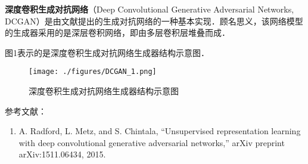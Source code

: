 
\textbf{深度卷积生成对抗网络}（Deep Convolutional Generative Adversarial Networks, DCGAN）是由文献\cite{DCGAN}提出的生成对抗网络的一种基本实现．顾名思义，该网络模型的生成器采用的是深层卷积网络，即由多层卷积层堆叠而成．

图1表示的是深度卷积生成对抗网络生成器结构示意图．
\begin{figure}[ht]
\centering
\texttt{[image: ./figures/DCGAN\_1.png]}
\caption{深度卷积生成对抗网络生成器结构示意图} \label{DCGAN_fig1}
\end{figure}







参考文献：
\begin{enumerate}
\item A. Radford, L. Metz, and S. Chintala, “Unsupervised representation learning with deep convolutional generative adversarial networks,” arXiv preprint arXiv:1511.06434, 2015.
\end{enumerate}